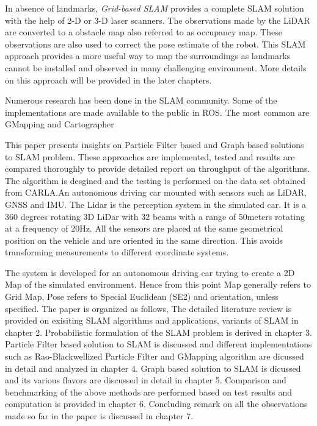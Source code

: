 In absence of landmarks, \textit{Grid-based SLAM} provides a complete SLAM solution with the help of 2-D or 3-D laser scanners. The observations made by the LiDAR are 
converted to a obstacle map also referred to as occupancy map. These observations are also used to correct the pose estimate of the robot. This SLAM approach provides
a more useful way to map the surroundings as landmarks cannot be installed and observed in many challenging environment. More details on this approach will be provided in the 
later chapters.

Numerous research has been done in the SLAM community. Some of the implementations are made available to the public in ROS. The most common are GMapping and Cartographer

This paper presents insights on Particle Filter based and Graph based solutions to SLAM problem. These approaches are implemented, tested and results are compared thoroughly 
to provide detailed report on throughput of the algorithms. The algorithm is desgined and the testing is performed on the data set obtained from CARLA.An autonomous driving car mounted with
sensors such as LiDAR, GNSS and IMU. The Lidar is the perception system in the simulated car. It is a 360 degrees rotating 3D LiDar with 32 beams with a range of 50meters rotating at a
 frequency of 20Hz. All the sensors are placed at the same geometrical position on the vehicle and are oriented in the same direction. This avoids transforming
measurements to different coordinate systems.

 The system is developed for an autonomous driving car trying to create a 2D Map of the simulated environment. Hence from this point Map generally refers to Grid Map, Pose refers to Special Euclidean (SE2) and 
orientation, unless specified.
The paper is organized as follows, The detailed literature review is provided on exisiting SLAM algorithms and applications, variants of SLAM in chapter 2. Probabilistic formulation of the SLAM
problem is derived in chapter 3. Particle Filter based solution to SLAM is discussed and different implementations such as Rao-Blackwellized Particle Filter and GMapping
algorithm are dicussed in detail and analyzed in chapter 4. Graph based solution to SLAM is dicussed and its various flavors are discussed in detail in chapter 5.
Comparison and benchmarking of the above methods are performed based on test results and computation is provided in chapter 6. Concluding remark on all the observations 
made so far in the paper is discussed in chapter 7.

